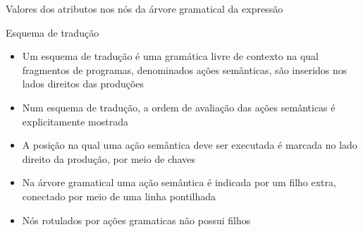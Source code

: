 \begin{frame}[fragile]{Valores dos atributos nos nós da árvore gramatical da expressão }

    \begin{figure}
        \centering

    \end{figure}

\end{frame}

\begin{frame}[fragile]{Esquema de tradução}

    \begin{itemize}
        \item Um esquema de tradução é uma gramática livre de contexto na qual fragmentos de programas, denominados ações semânticas, são inseridos nos lados
            direitos das produções

        \item Num esquema de tradução, a ordem de avaliação das ações semânticas é explicitamente mostrada

        \item A posição na qual uma ação semântica deve ser executada é marcada no lado direito da produção, por meio de chaves

        \item Na árvore gramatical uma ação semântica é indicada por um filho extra, conectado por meio de uma linha pontilhada

        \item Nós rotulados por ações gramaticas não possui filhos
    \end{itemize}

\end{frame}

